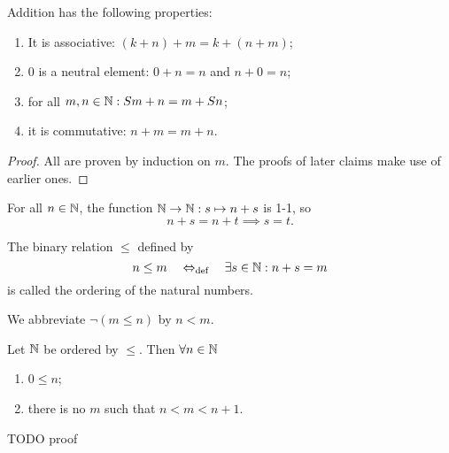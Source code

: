 \begin{proposition}
Addition has the following properties:
\begin{enumerate}
\item It is associative: $(k+n)+m = k+(n+m)$;
\item $0$ is a neutral element: $0+n = n$ and $n+0 = n$;
\item for all $m,n\in \mathbb{N}: Sm+n = m+Sn$;
\item it is commutative: $n+m = m+n$.
\end{enumerate}
\end{proposition}
\begin{proof}
All are proven by induction on $m$. The proofs of later claims make use of earlier ones.
\end{proof}
\begin{lemma}
For all $n\in \mathbb{N}$, the function $\mathbb{N}\to \mathbb{N}: s\mapsto n+s$ is 1-1, so
\[n+s = n+t \implies s=t.\]
\end{lemma}

\begin{definition}
The binary relation $\leq$ defined by
\[ n \leq m \quad\Leftrightarrow_{\text{def}}\quad \exists s\in \mathbb{N}: n+s = m \]
is called the ordering of the natural numbers.

We abbreviate $\neg(m\leq n)$ by $n < m$.
\end{definition}

\begin{lemma} \label{orderingN}
Let $\mathbb{N}$ be ordered by $\leq$. Then $\forall n\in\mathbb{N}$
\begin{enumerate}
\item $0\leq n$;
\item there is no $m$ such that $n<m<n+1$.
\end{enumerate}
\end{lemma}
TODO proof

